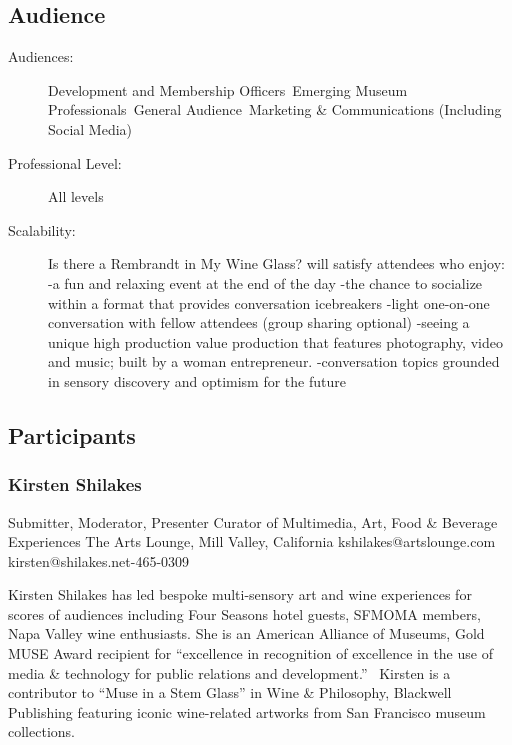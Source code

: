 \documentclass{report}
\begin{document}
              \subsection*{Audience}
                \begin{description}
                  \item [Audiences:]Development and Membership Officers~Emerging Museum Professionals~General Audience~Marketing \& Communications (Including Social Media)~
                  \item[Professional Level:]All levels~
                \item[Scalability:] Is there a Rembrandt in My Wine Glass? will satisfy attendees who enjoy: 
-a fun and relaxing event at the end of the day
-the chance to socialize within a format that provides conversation icebreakers
-light one-on-one conversation with fellow attendees (group sharing optional)
-seeing a unique high production value production that features photography, video and music; built by a woman entrepreneur.
-conversation topics grounded in sensory discovery and optimism for the future

							
              \end{description}
            \subsection*{Participants}
              \subsubsection*{ Kirsten Shilakes }
              Submitter, Moderator, Presenter\newline
              Curator of Multimedia, Art, Food \& Beverage Experiences\newline
              The Arts Lounge, Mill Valley, California
              \newline
              kshilakes@artslounge.com\newline
              kirsten@shilakes.net-465-0309\newline

              Kirsten Shilakes has led bespoke multi-sensory art and wine experiences for scores of audiences including Four Seasons hotel guests, SFMOMA members, Napa Valley wine enthusiasts. She is an American Alliance of Museums, Gold MUSE Award recipient for “excellence in recognition of excellence in the use of media \& technology for public relations and development.”  Kirsten is a contributor to “Muse in a Stem Glass” in Wine \& Philosophy, Blackwell Publishing featuring iconic wine-related artworks from San Francisco museum collections. 
 
\end{document}

